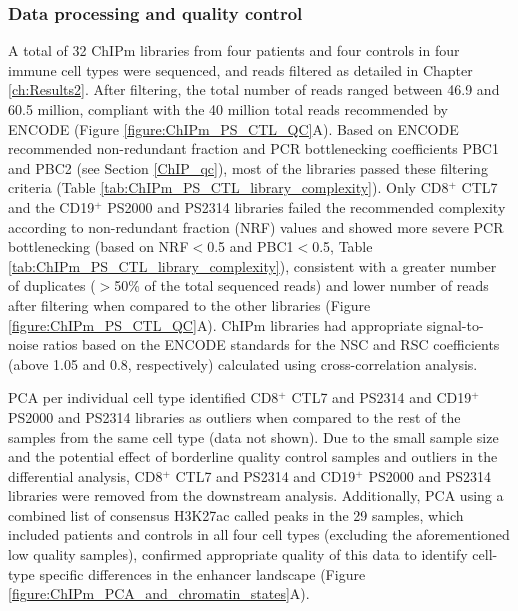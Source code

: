 \subsubsection{Data processing and quality control}

A total of 32 ChIPm libraries from four patients and four controls in four immune cell types were sequenced, and reads filtered as detailed in Chapter \ref{ch:Results2}. After filtering, the total number of reads ranged between 46.9 and 60.5 million, compliant with the 40 million total reads recommended by ENCODE (Figure \ref{figure:ChIPm_PS_CTL_QC}A). Based on ENCODE recommended non-redundant fraction and PCR bottlenecking coefficients PBC1 and PBC2 (see Section \ref{ChIP_qc}), most of the libraries passed these filtering criteria (Table \ref{tab:ChIPm_PS_CTL_library_complexity}). Only CD8$^+$ CTL7 and the CD19$^+$ PS2000 and PS2314 libraries failed the recommended complexity according to non-redundant fraction (NRF) values and showed more severe PCR bottlenecking (based on NRF$<$0.5 and PBC1$<$0.5, Table \ref{tab:ChIPm_PS_CTL_library_complexity}), consistent with a greater number of duplicates ($>$50\% of the total sequenced reads) and lower number of reads after filtering when compared to the other libraries (Figure \ref{figure:ChIPm_PS_CTL_QC}A). ChIPm libraries had appropriate signal-to-noise ratios based on the ENCODE standards \parencite{Landt2012} for the NSC and RSC coefficients (above 1.05 and 0.8, respectively) calculated using cross-correlation analysis.

PCA per individual cell type identified CD8$^+$ CTL7 and PS2314 and CD19$^+$ PS2000 and PS2314 libraries as outliers when compared to the rest of the samples from the same cell type (data not shown). Due to the small sample size and the potential effect of borderline quality control samples and outliers in the differential analysis, CD8$^+$ CTL7 and PS2314 and CD19$^+$ PS2000 and PS2314 libraries were removed from the downstream analysis. Additionally, PCA using a combined list of consensus H3K27ac called peaks in the 29 samples, which included patients and controls in all four cell types (excluding the aforementioned low quality samples), confirmed appropriate quality of this data to identify cell-type specific differences in the enhancer landscape (Figure \ref{figure:ChIPm_PCA_and_chromatin_states}A). 
 

